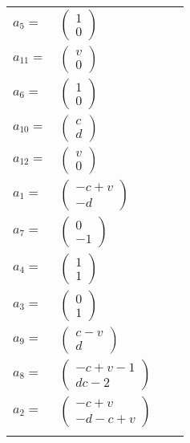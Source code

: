 \documentclass[1p]{elsarticle_modified}
\theoremstyle{definition}
\begin{document}
\begin{tabular}{m{7pt} m{180pt} m{7pt} m{180pt} }
\flushright $a_{5}=$&$\begin{pmatrix}1\\0\end{pmatrix}$ \\
\flushright $a_{11}=$&$\begin{pmatrix}v\\0\end{pmatrix}$ \\
\flushright $a_{6}=$&$\begin{pmatrix}1\\0\end{pmatrix}$ \\
\flushright $a_{10}=$&$\begin{pmatrix}c\\d\end{pmatrix}$ \\
\flushright $a_{12}=$&$\begin{pmatrix}v\\0\end{pmatrix}$ \\
\flushright $a_{1}=$&$\begin{pmatrix}- c+v\\- d\end{pmatrix}$ \\
\flushright $a_{7}=$&$\begin{pmatrix}0\\-1\end{pmatrix}$ \\
\flushright $a_{4}=$&$\begin{pmatrix}1\\1\end{pmatrix}$ \\
\flushright $a_{3}=$&$\begin{pmatrix}0\\1\end{pmatrix}$ \\
\flushright $a_{9}=$&$\begin{pmatrix}c- v\\d\end{pmatrix}$ \\
\flushright $a_{8}=$&$\begin{pmatrix}- c+v-1\\d c-2\end{pmatrix}$ \\
\flushright $a_{2}=$&$\begin{pmatrix}- c+v\\- d- c+v\end{pmatrix}$\\&\end{tabular}
\end{document}
